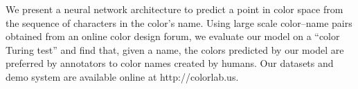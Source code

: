 We present a neural network architecture to predict a point in color space from the sequence of characters in the color's name.  Using large scale color--name pairs obtained from an online color design forum, we evaluate our model on a ``color Turing test'' and find that, given a name, the colors predicted by our model are preferred by annotators to color names created by humans. Our datasets and demo system are available online at http://colorlab.us.
